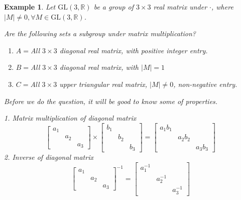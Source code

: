 \documentclass{article}
\theoremstyle{MyNonumberplain}
\theoremstyle{break}
\theoremstyle{break}
\newtheorem{example}{Example}[section]
\theoremstyle{break}
\theoremstyle{definition}
\theoremstyle{break}
\begin{document}
\begin{expbox}
    \begin{example}
        Let $\text{GL} (3, \mathbb{R})$ be a group of $3 \times 3$ real matrix under
        $\cdot$, where $| M | \neq 0, \forall M \in \text{GL} (3, \mathbb{R})$.\bigskip

        Are the following sets a subgroup under matrix multiplication?\bigskip
        \begin{enumerate}
        \item $A =$All $3 \times 3$ diagonal real matrix, with positive integer
        entry.\bigskip
        
        \item $B =$All $3 \times 3$ diagonal real matrix, with $| M | = 1$\bigskip
        
        \item $C =$All $3 \times 3$ upper triangular real matrix, $| M | \neq 0$,
        non-negative entry.\bigskip
        \end{enumerate}

        Before we do the question, it will be good to know some of properties.

        1. Matrix multiplication of diagonal matrix
        \[ \left[\begin{array}{ccc}
            a_1 &  & \\
            & a_2 & \\
            &  & a_3
        \end{array}\right] \times \left[\begin{array}{ccc}
            b_1 &  & \\
            & b_2 & \\
            &  & b_3
        \end{array}\right] = \left[\begin{array}{ccc}
            a_1 b_1 &  & \\
            & a_2 b_2 & \\
            &  & a_3 b_3
        \end{array}\right] \]
        2. Inverse of diagonal matrix
        \[ \left[\begin{array}{ccc}
            a_1 &  & \\
            & a_2 & \\
            &  & a_3
        \end{array}\right]^{- 1} = \left[\begin{array}{ccc}
            a^{- 1}_1 &  & \\
            & a^{- 1}_2 & \\
            &  & a^{- 1}_3
        \end{array}\right] \]\bigskip


\end{example}
\end{expbox}
\end{document}
